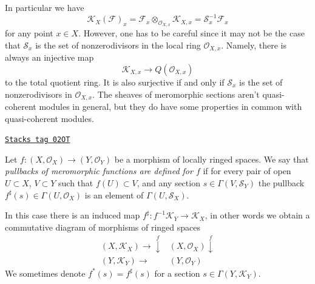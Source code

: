 In particular we have
$$
\mathcal{K}_X(\mathcal{F})_x
=
\mathcal{F}_x \otimes_{\mathcal{O}_{X, x}} \mathcal{K}_{X, x}
=
\mathcal{S}_x^{-1}\mathcal{F}_x
$$
for any point $x \in X$. However, one has to be careful since it may
not be the case that $\mathcal{S}_x$ is the set of nonzerodivisors
in the local ring $\mathcal{O}_{X, x}$. Namely, there is always
an injective map
$$
\mathcal{K}_{X, x} \longrightarrow Q(\mathcal{O}_{X, x})
$$
to the total quotient ring. It is also surjective if and only if
$\mathcal{S}_x$ is the set of nonzerodivisors in $\mathcal{O}_{X, x}$.
The sheaves of meromorphic sections aren't quasi-coherent
modules in general, but they do have some properties in common
with quasi-coherent modules.

\begin{definition}
\label{divisors-definition-pullback-meromorphic-sections}
\href{https://stacks.math.columbia.edu/tag/02OT}{\texttt{Stacks tag 02OT}}

Let $f : (X, \mathcal{O}_X) \to (Y, \mathcal{O}_Y)$ be a morphism
of locally ringed spaces. We say that {\it pullbacks of meromorphic
functions are defined for $f$} if for every pair of open
$U \subset X$, $V \subset Y$ such that $f(U) \subset V$, and any
section $s \in \Gamma(V, \mathcal{S}_Y)$ the pullback
$f^\sharp(s) \in \Gamma(U, \mathcal{O}_X)$ is an element
of $\Gamma(U, \mathcal{S}_X)$.
\end{definition}

In this case there is an induced map
$f^\sharp : f^{-1}\mathcal{K}_Y \to \mathcal{K}_X$,
in other words we obtain a commutative diagram of morphisms
of ringed spaces
$$
\begin{array}{cc}(X, \mathcal{K}_X) \longrightarrow\overset{f}{\downarrow} & (X, \mathcal{O}_X) \overset{f}{\downarrow} \\ (Y, \mathcal{K}_Y) \longrightarrow & (Y, \mathcal{O}_Y)\end{array}
$$
We sometimes denote $f^*(s) = f^\sharp(s)$ for a
section $s \in \Gamma(Y, \mathcal{K}_Y)$.

